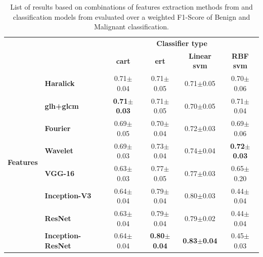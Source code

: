 \documentclass[journal,article,submit,moreauthors,pdftex, applsci]{Definitions/mdpi}
\begin{document}
\begin{table}[h]
    \centering
    \begin{tabular}{llcccc}
    \multicolumn{2}{c}{}                                                &\multicolumn{4}{c}{\textbf{Classifier type}}                                                           \\ \cline{3-6}
    \multicolumn{2}{c}{}                                                &\textbf{\ac{cart}}     &\textbf{\ac{ert}}          &\textbf{Linear \ac{svm}}   &\textbf{RBF \ac{svm}}  \\ \hline
    \multirow{8}{*}{\textbf{Features}}  &\textbf{Haralick}              &0.71$\pm$0.04          &0.71$\pm$0.05              &0.71$\pm$0.05              &0.70$\pm$0.06          \\ \cline{2-6} 
                                        &\textbf{\ac{glh}+\ac{glcm}}    &\textbf{0.71$\pm$0.03} &0.71$\pm$0.05              &0.70$\pm$0.05              &0.71$\pm$0.04          \\ \cline{2-6} 
                                        &\textbf{Fourier}               &0.69$\pm$0.05          &0.70$\pm$0.04              &0.72$\pm$0.03              &0.69$\pm$0.06          \\ \cline{2-6} 
                                        &\textbf{Wavelet}               &0.69$\pm$0.03          &0.73$\pm$0.04              &0.74$\pm$0.04              &\textbf{0.72$\pm$0.03} \\ \cline{2-6} 
                                        &\textbf{VGG-16}                &0.63$\pm$0.03          &0.77$\pm$0.05              &0.77$\pm$0.03              &0.65$\pm$0.20          \\ \cline{2-6} 
                                        &\textbf{Inception-V3}          &0.64$\pm$0.04          &0.79$\pm$0.04              &0.80$\pm$0.03              &0.44$\pm$0.04          \\ \cline{2-6} 
                                        &\textbf{ResNet}                &0.63$\pm$0.04          &0.79$\pm$0.04              &0.79$\pm$0.02              &0.44$\pm$0.04          \\ \cline{2-6} 
                                        &\textbf{Inception-ResNet}      &0.64$\pm$0.04          &\textbf{0.80$\pm$0.04}     &\textbf{0.83$\pm$0.04}     &0.45$\pm$0.03          \\ \hline 
    \end{tabular}    
    \caption{List of results based on combinations of features extraction methods from  and classification models from  evaluated over a weighted F1-Score of Benign and Malignant classification.}
    \label{tab:image_results}
\end{table}
\end{document}
